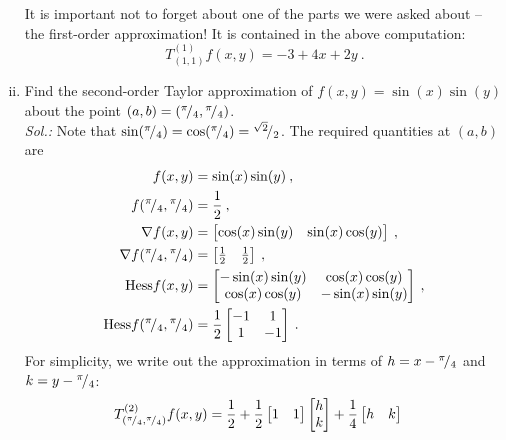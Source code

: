 \begin{example}
\begin{enumerate}[(i)]
	It is important not to forget about one of the parts we were asked about -- the first-order approximation! It is contained in the above computation:
	\[ T^{(1)}_{(1,1)}f(x,y) = -3 +4x+2y \:. \]
	\item Find the second-order Taylor approximation of $f(x,y)= \sin(x)\sin(y)$ about the point $(a,b)=({}^{\pi}\!/_{4},{}^{\pi}\!/_{4})$. \\
	{\it Sol.:}
    Note that $\sin({}^{\pi}\!/_{4})=\cos({}^{\pi}\!/_{4})={}^{\sqrt{2}}\!/_{2}$. The required quantities at $(a,b)$ are
	\begin{equation*}
	\begin{split}
	f(x,y) & = \sin(x)\sin(y) \:, \\
	f({}^{\pi}\!/_{4},{}^{\pi}\!/_{4}) & = \frac{1}{2} \:, \\
	\nabla f(x,y) & = \begin{bmatrix} \cos(x)\sin(y) & \sin(x)\cos(y) \end{bmatrix} \:, \\
	\nabla f({}^{\pi}\!/_{4},{}^{\pi}\!/_{4}) 
	& = \begin{bmatrix} \frac12 & \frac12 \end{bmatrix} \:, \\
	\mathrm{Hess}f(x,y) & = \begin{bmatrix}
	-\sin(x)\sin(y) & \cos(x)\cos(y) \\ \cos(x)\cos(y) & -\sin(x)\sin(y) \end{bmatrix} \:, \\
	\mathrm{Hess}f({}^{\pi}\!/_{4},{}^{\pi}\!/_{4}) 
	& = \frac{1}{2} \begin{bmatrix} -1 & 1 \\ 1 & -1 \end{bmatrix} \:.
	\end{split}
	\end{equation*}
	For simplicity, we write out the approximation in terms of $h=x-{}^{\pi}\!/_{4}$ and $k=y-{}^{\pi}\!/_{4}$:
	\begin{equation*}
	\begin{split}
	T^{(2)}_{(\rfrac{\pi}{4},\rfrac{\pi}{4})}f(x,y) 
	& = \frac{1}{2} + \frac{1}{2} \begin{bmatrix} 1 & 1 \end{bmatrix}
	\begin{bmatrix} h \\ k \end{bmatrix}
	+ \frac{1}{4} 	\begin{bmatrix} h & k \end{bmatrix}

\end{split}
\end{equation*}
\end{enumerate}
\end{example}
